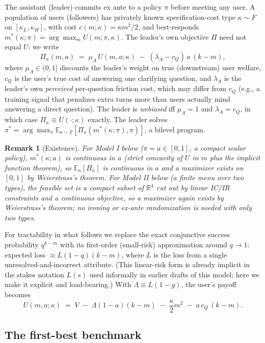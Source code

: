 \documentclass[11pt]{article}
\newtheorem{remark}{Remark}
\begin{document}
The assistant (leader) commits ex ante to a policy $\pi$ before meeting any user.
A population of users (followers) has privately known specification-cost type
$\kappa \sim F$ on $[\kappa_L,\kappa_H]$, with cost $c(m;\kappa)=\kappa m^2/2$, and
best-responds $m^*(\kappa;\pi) = \arg\max_m U(m;\pi,\kappa)$. The leader's own
objective $\Pi$ need not equal $U$: we write
\[
\Pi_\kappa(m,a) \;=\; \mu_A\, U(m,a;\kappa) \;-\; (\lambda_A - c_Q)\, a\,(k-m),
\]
where $\mu_A \in (0,1]$ discounts the leader's weight on true (downstream) user
welfare, $c_Q$ is the user's true cost of answering one clarifying question, and
$\lambda_A$ is the leader's own \emph{perceived} per-question friction cost, which
may differ from $c_Q$ (e.g., a training signal that penalizes extra turns more
than users actually mind answering a direct question). The leader is
\emph{unbiased} iff $\mu_A=1$ and $\lambda_A=c_Q$, in which case $\Pi_\kappa \equiv
U(\cdot;\kappa)$ exactly. The leader solves
$\pi^* = \arg\max_\pi \mathbb{E}_{\kappa\sim F}[\Pi_\kappa(m^*(\kappa;\pi),\pi)]$,
a bilevel program.

\begin{remark}[Existence]
For Model I below ($\pi=a\in[0,1]$, a compact scalar policy), $m^*(\kappa;a)$ is
continuous in $a$ (strict concavity of $U$ in $m$ plus the implicit function
theorem), so $\mathbb{E}_\kappa[\Pi_\kappa]$ is continuous in $a$ and a maximizer
exists on $[0,1]$ by Weierstrass's theorem. For Model II below (a finite menu over
two types), the feasible set is a compact subset of $\mathbb{R}^4$ cut out by
linear IC/IR constraints and a continuous objective, so a maximizer again exists
by Weierstrass's theorem; no ironing or ex-ante randomization is needed with only
two types.
\end{remark}

For tractability in what follows we replace the exact conjunctive success
probability $q^{k-m}$ with its first-order (small-risk) approximation around
$q\to 1$: expected loss $\approx L(1-q)(k-m)$, where $L$ is the loss from a single
unresolved-and-incorrect attribute. (This linear-risk form is already implicit in
the stakes notation $L(s)$ used informally in earlier drafts of this model; here we
make it explicit and load-bearing.) With $\Lambda \equiv L(1-g)$, the user's payoff
becomes
\[
U(m,a;\kappa) \;=\; V \;-\; \Lambda(1-a)(k-m) \;-\; \frac{\kappa}{2}m^2 \;-\; a\,c_Q\,(k-m).
\]

\subsection{The first-best benchmark}
\label{sec:firstbest}
\end{document}
